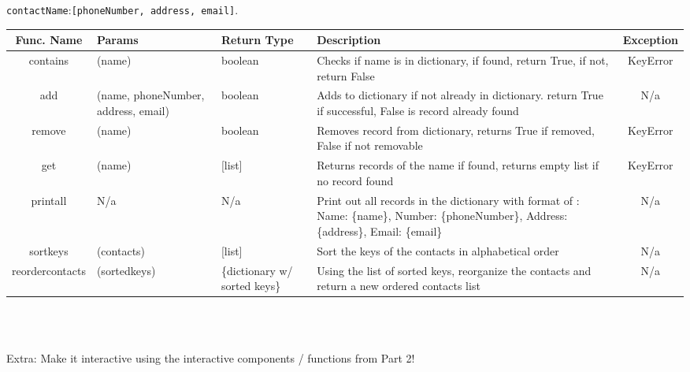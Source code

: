 \documentclass[12pt]{report}
\begin{document}
\lstinline[language=Python]{contactName}:\lstinline[language=Python]{[phoneNumber, address, email]}.

\begin{tabular}{| c | A | L | L | c |}
    \hline
    Func. Name & Params & Return Type & Description & Exception \\
    \hline
    contains & (name) & boolean & Checks if name is in dictionary, if found, return True, if not, return False & KeyError \\
    \hline
    add & (name, phoneNumber, address, email) & boolean & Adds to dictionary if not already in dictionary. return True if successful, False is record already found & N/a \\
    \hline
    remove & (name) & boolean & Removes record from dictionary, returns True if removed, False if not removable & KeyError \\
    \hline
    get & (name) & [list] & Returns records of the name if found, returns empty list if no record found & KeyError \\
    \hline
    printall & N/a & N/a & Print out all records in the dictionary with format of : \newline Name: \{name\}, Number: \{phoneNumber\}, Address: \{address\}, Email: \{email\} & N/a\\ 
    \hline
    sortkeys & (contacts) & [list] & Sort the keys of the contacts in alphabetical order & N/a \\
    \hline
    reordercontacts & (sortedkeys) & \{dictionary w/ sorted keys\} & Using the list of sorted keys, reorganize the contacts and return a new ordered contacts list & N/a \\
    \hline
\end{tabular}\\

${}$

Extra: Make it interactive using the interactive components / functions from Part 2!

\newpage
\end{document}
